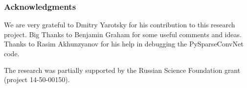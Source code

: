 \subsubsection*{Acknowledgments}
We are very grateful to Dmitry Yarotsky for his contribution to this research project. Big Thanks to Benjamin Graham for some useful comments and ideas. Thanks to Rasim Akhunzyanov for his help in debugging the PySparseConvNet code.

The research was partially supported by the Russian Science Foundation grant (project 14-50-00150).